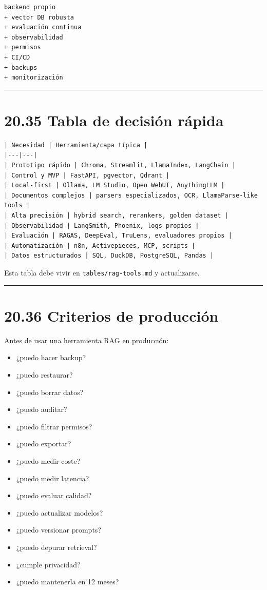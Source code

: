 \begin{lstlisting}
backend propio
+ vector DB robusta
+ evaluación continua
+ observabilidad
+ permisos
+ CI/CD
+ backups
+ monitorización
\end{lstlisting}

\begin{center}\rule{0.5\linewidth}{0.5pt}\end{center}

\section{20.35 Tabla de decisión
rápida}\label{tabla-de-decisiuxf3n-ruxe1pida}

\begin{lstlisting}
| Necesidad | Herramienta/capa típica |
|---|---|
| Prototipo rápido | Chroma, Streamlit, LlamaIndex, LangChain |
| Control y MVP | FastAPI, pgvector, Qdrant |
| Local-first | Ollama, LM Studio, Open WebUI, AnythingLLM |
| Documentos complejos | parsers especializados, OCR, LlamaParse-like tools |
| Alta precisión | hybrid search, rerankers, golden dataset |
| Observabilidad | LangSmith, Phoenix, logs propios |
| Evaluación | RAGAS, DeepEval, TruLens, evaluadores propios |
| Automatización | n8n, Activepieces, MCP, scripts |
| Datos estructurados | SQL, DuckDB, PostgreSQL, Pandas |
\end{lstlisting}

Esta tabla debe vivir en \passthrough{\lstinline!tables/rag-tools.md!} y
actualizarse.

\begin{center}\rule{0.5\linewidth}{0.5pt}\end{center}

\section{20.36 Criterios de
producción}\label{criterios-de-producciuxf3n}

Antes de usar una herramienta RAG en producción:

\begin{itemize}
\tightlist
\item
  ¿puedo hacer backup?
\item
  ¿puedo restaurar?
\item
  ¿puedo borrar datos?
\item
  ¿puedo auditar?
\item
  ¿puedo filtrar permisos?
\item
  ¿puedo exportar?
\item
  ¿puedo medir coste?
\item
  ¿puedo medir latencia?
\item
  ¿puedo evaluar calidad?
\item
  ¿puedo actualizar modelos?
\item
  ¿puedo versionar prompts?
\item
  ¿puedo depurar retrieval?
\item
  ¿cumple privacidad?
\item
  ¿puedo mantenerla en 12 meses?
\end{itemize}

